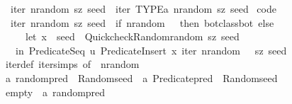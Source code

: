 \begin{isabellebody}
\isanewline
\ \ {\isachardoublequoteopen}iter\ nrandom\ sz\ seed\ {\isacharequal}{\kern0pt}\ iter{\isacharprime}{\kern0pt}\ {\isacharparenleft}{\kern0pt}TYPE{\isacharparenleft}{\kern0pt}{\isacharprime}{\kern0pt}a{\isacharparenright}{\kern0pt}{\isacharparenright}{\kern0pt}\ nrandom\ sz\ seed{\isachardoublequoteclose}\isanewline
\isanewline
{}\isamarkupfalse%
\ {\isacharbrackleft}{\kern0pt}code{\isacharbrackright}{\kern0pt}{\isacharcolon}{\kern0pt}\isanewline
\ \ {\isachardoublequoteopen}iter\ nrandom\ sz\ seed\ {\isacharequal}{\kern0pt}\ {\isacharparenleft}{\kern0pt}if\ nrandom\ {\isacharequal}{\kern0pt}\ {}\ then\ bot{\isacharunderscore}{\kern0pt}class{\isachardot}{\kern0pt}bot\ else\isanewline
\ \ \ \ \ let\ {\isacharparenleft}{\kern0pt}{\isacharparenleft}{\kern0pt}x{\isacharcomma}{\kern0pt}\ {\isacharunderscore}{\kern0pt}{\isacharparenright}{\kern0pt}{\isacharcomma}{\kern0pt}\ seed{\isacharprime}{\kern0pt}{\isacharparenright}{\kern0pt}\ {\isacharequal}{\kern0pt}\ Quickcheck{\isacharunderscore}{\kern0pt}Random{\isachardot}{\kern0pt}random\ sz\ seed\isanewline
\ \ \ in\ Predicate{\isachardot}{\kern0pt}Seq\ {\isacharparenleft}{\kern0pt}{\isacharpercent}{\kern0pt}u{\isachardot}{\kern0pt}\ Predicate{\isachardot}{\kern0pt}Insert\ x\ {\isacharparenleft}{\kern0pt}iter\ {\isacharparenleft}{\kern0pt}nrandom\ {\isacharminus}{\kern0pt}\ {}{\isacharparenright}{\kern0pt}\ sz\ seed{\isacharprime}{\kern0pt}{\isacharparenright}{\kern0pt}{\isacharparenright}{\kern0pt}{\isacharparenright}{\kern0pt}{\isachardoublequoteclose}\isanewline
%
\isadelimproof
\ \ \ %
\endisadelimproof
%
\isatagproof
{}\isamarkupfalse%
\ iter{\isacharunderscore}{\kern0pt}def\ iter{\isacharprime}{\kern0pt}{\isachardot}{\kern0pt}simps\ {\isacharbrackleft}{\kern0pt}of\ {\isacharunderscore}{\kern0pt}\ nrandom{\isacharbrackright}{\kern0pt}\ \isacommand{{\isachardot}{\kern0pt}{\isachardot}{\kern0pt}}\isamarkupfalse%
%
\endisatagproof
{\isafoldproof}%
%
\isadelimproof
\isanewline
%
\endisadelimproof
\isanewline
{}\isamarkupfalse%
\ {\isacharprime}{\kern0pt}a\ random{\isacharunderscore}{\kern0pt}pred\ {\isacharequal}{\kern0pt}\ {\isachardoublequoteopen}Random{\isachardot}{\kern0pt}seed\ {\isasymRightarrow}\ {\isacharparenleft}{\kern0pt}{\isacharprime}{\kern0pt}a\ Predicate{\isachardot}{\kern0pt}pred\ {\isasymtimes}\ Random{\isachardot}{\kern0pt}seed{\isacharparenright}{\kern0pt}{\isachardoublequoteclose}\isanewline
\isanewline
{}\isamarkupfalse%
\ empty\ {\isacharcolon}{\kern0pt}{\isacharcolon}{\kern0pt}\ {\isachardoublequoteopen}{\isacharprime}{\kern0pt}a\ random{\isacharunderscore}{\kern0pt}pred{\isachardoublequoteclose}\isanewline

\end{isabellebody}
